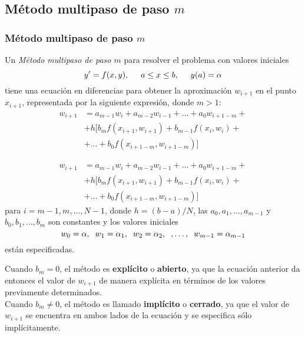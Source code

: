 \subsection{Método multipaso de paso $m$}
\begin{frame}
\frametitle{Método multipaso de paso $m$}
Un \emph{Método multipaso de paso $m$} para resolver el problema con valores iniciales
\[ y' = f(x,y),\hspace{0.5cm} a \leq x \leq b, \hspace{0.5cm} y(a) = \alpha \]
tiene una ecuación en diferencias para obtener la aproximación $w_{i+1}$ en el punto $x_{i+1}$, representada por la siguiente expresión, donde $m>1$:
\[ \begin{split}
w_{i+1} &= a_{m-1} w_{i} + a_{m-2 }w_{i-1} + \ldots + a_{0} w_{i+1-m} + \\ 
&+ h[b_{m} f(x_{i+1},w_{i+1}) + b_{m-1} f(x_{i},w_{i}) + \\
&+ \ldots + b_{0} f(x_{i+1-m}, w_{i+1-m})]
\end{split} \]
\end{frame}
\begin{frame}
\[ \begin{split}
w_{i+1} &= a_{m-1} w_{i} + a_{m-2 }w_{i-1} + \ldots + a_{0} w_{i+1-m} + \\ 
&+ h[b_{m} f(x_{i+1},w_{i+1}) + b_{m-1} f(x_{i},w_{i}) + \\
&+ \ldots + b_{0} f(x_{i+1-m}, w_{i+1-m})]
\end{split} \]
para $i=m-1,m,\ldots,N-1$, donde $h=(b-a)/N$, las $a_{0},a_{1},\ldots,a_{m-1}$ y $b_{0}, b_{1},\ldots,b_{m}$ son constantes y los valores iniciales
\[ w_{0} = \alpha, \hspace{0.2cm} w_{1} = \alpha_{1}, \hspace{0.2cm} w_{2} = \alpha_{2}, \hspace{0.2cm}, \ldots, \hspace{0.2cm} w_{m-1} = \alpha_{m-1} \]
están especificadas.
\end{frame}
\begin{frame}
Cuando $b_{m}=0$, el método es \textbf{explícito} o \textbf{abierto}, ya que la ecuación anterior da entonces el valor de $w_{i+1}$ de manera explícita en términos de los valores previamente determinados.
\\
\medskip
\pause
Cuando $b_{m} \neq 0$, el método es llamado \textbf{implícito} o \textbf{cerrado}, ya que el valor de $w_{i+1}$ se encuentra en ambos lados de la ecuación y se especifica sólo implícitamente.
\end{frame}
